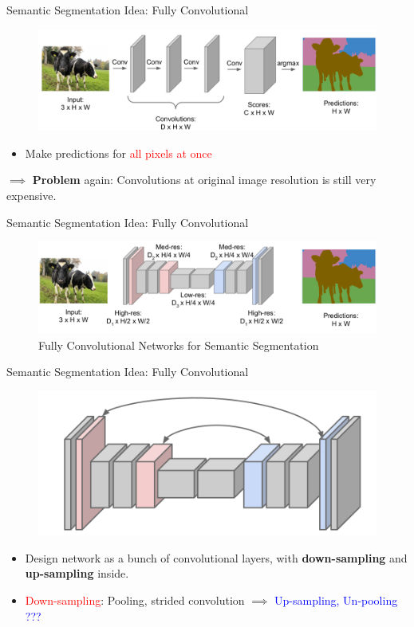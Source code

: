 \documentclass[aspectratio=169]{beamer}
\begin{document}
\begin{frame}{Semantic Segmentation Idea: Fully Convolutional}
\begin{figure}
    \centering
    \includegraphics[scale=.3]{demo/figs/fconv.png}
\end{figure}
\begin{itemize}
    \item Make predictions for \textcolor{red}{all pixels at once}
\end{itemize}
$\implies$ \textbf{Problem} again: Convolutions at original image resolution is still very expensive.
\end{frame}

\begin{frame}{Semantic Segmentation Idea: Fully Convolutional}
 \begin{figure}
    \centering
    \includegraphics[scale=.35]{demo/figs/fconv2.png}
    \caption{Fully Convolutional Networks for Semantic Segmentation}
\end{figure}  
\end{frame}

\begin{frame}{Semantic Segmentation Idea: Fully Convolutional}
\begin{figure}
    \centering
    \includegraphics[scale=.25]{demo/figs/encoderdecoder.png}
\end{figure}
\begin{itemize}
    \item Design network as a bunch of convolutional layers, with \textbf{down-sampling} and \textbf{up-sampling} inside.
    \item \textcolor{red}{Down-sampling}: Pooling, strided convolution $\implies$ \textcolor{blue}{Up-sampling, Un-pooling ???}
\end{itemize}
\end{frame}
\end{document}
